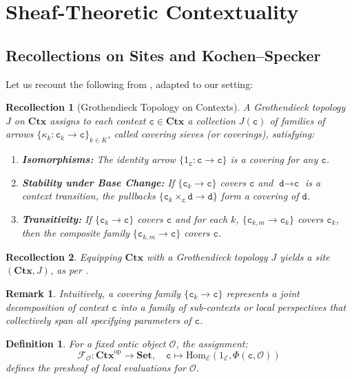 \documentclass{article}
\newtheorem{dn}{Definition}
\newtheorem{rk}{Remark}
\newtheorem{rc}{Recollection}
\numberwithin{tm}{section}
\numberwithin{dn}{section}
\numberwithin{as}{section}
\numberwithin{rk}{section}
\numberwithin{lem}{section}
\numberwithin{ax}{section}
\numberwithin{pp}{section}
\numberwithin{eg}{section}
\numberwithin{war}{section}
\numberwithin{equation}{section}
\numberwithin{prop}{section}
\numberwithin{nt}{section}
\numberwithin{rc}{section}
\def\code#1{\texttt{#1}}
\begin{document}
\section{Sheaf-Theoretic Contextuality} \label{sheaf}
\subsection{Recollections on Sites and Kochen--Specker} \label{Groth} 
Let us recount the following from \cite{johnstone, maclane}, adapted to our setting:
\begin{rc}[Grothendieck Topology on Contexts] 
	A \emph{Grothendieck topology} $J$ on $\mathbf{Ctx}$ assigns to each context $\code{c} \in \mathbf{Ctx}$ a collection $J(\code{c})$ of families of arrows $\{\kappa_k: \code{c}_k \to \code{c}\}_{k \in K}$, called \emph{covering sieves} (or \emph{coverings}), satisfying:
	\begin{enumerate}
		\item \textbf{Isomorphisms:} The identity arrow $\{1_\code{c}: \code{c} \to \code{c}\}$ is a covering for any $\code{c}$.
		\item \textbf{Stability under Base Change:} If $\{\code{c}_k \to \code{c}\}$ covers $\code{c}$ and $\code{d} \to \code{c}$ is a context transition, the pullbacks $\{\code{c}_k \times_\code{c} \code{d} \to \code{d}\}$ form a covering of $\code{d}$.
		\item \textbf{Transitivity:} If $\{\code{c}_k \to \code{c}\}$ covers $\code{c}$ and for each $k$, $\{\code{c}_{k, m} \to \code{c}_k\}$ covers $\code{c}_k$, then the composite family $\{\code{c}_{k, m} \to \code{c}\}$ covers $\code{c}$.
	\end{enumerate}
\end{rc}

\begin{rc}
	Equipping $\mathbf{Ctx}$ with a Grothendieck topology $J$ yields a site $(\mathbf{Ctx}, J)$, as per \cite{maclane}.
\end{rc}

\begin{rk}
	Intuitively, a covering family $\{\code{c}_k \to \code{c}\}$ represents a joint decomposition of context $\code{c}$ into a family of sub-contexts or local perspectives that collectively span all specifying parameters of $\code{c}$.
\end{rk}


\begin{dn}
	For a fixed ontic object $\mathcal{O}$, the assignment:
	\[
	\mathcal{F}_\mathcal{O}: \mathbf{Ctx}^{\text{op}} \longrightarrow \mathbf{Set}, \quad \code{c} \longmapsto \text{Hom}_\mathcal{E}(1_\mathcal{E}, \Phi(\code{c}, \mathcal{O}))
	\]
	defines the \emph{presheaf of local evaluations} for $\mathcal{O}$.
\end{dn}
\end{document}
